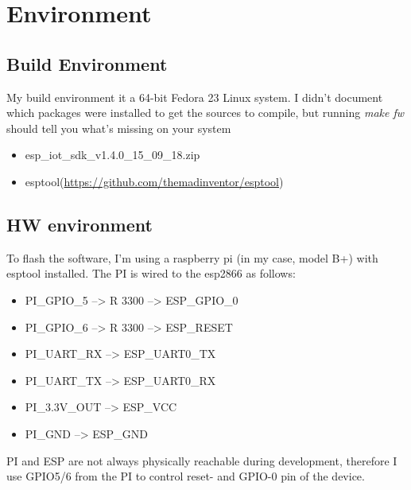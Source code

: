 \section{Environment}
\subsection{Build Environment}
My build environment it a 64-bit Fedora 23 Linux system. I didn't document which packages were installed to get the sources to compile, but running {\it make fw} should tell you what's missing on your system
\begin{itemize}
\item{esp\_iot\_sdk\_v1.4.0\_15\_09\_18.zip}
\item{esptool(\url{https://github.com/themadinventor/esptool})}
\end{itemize}

\subsection{HW environment}
To flash the software, I'm using a raspberry pi (in my case, model B+) with esptool installed. The PI is wired to the esp2866 as follows:
\begin{itemize}
\item{PI\_GPIO\_5 --> R 3300 --> ESP\_GPIO\_0}
\item{PI\_GPIO\_6 --> R 3300 --> ESP\_RESET}
\item{PI\_UART\_RX --> ESP\_UART0\_TX}
\item{PI\_UART\_TX --> ESP\_UART0\_RX}
\item{PI\_3.3V\_OUT --> ESP\_VCC}
\item{PI\_GND --> ESP\_GND}
\end{itemize}
PI and ESP are not always physically reachable during development, therefore I use GPIO5/6 from the PI to control reset- and GPIO-0 pin of the device.
\vfill
